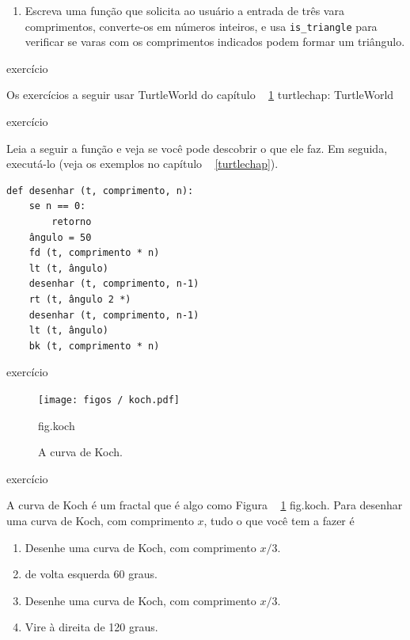 \documentclass[10pt]{book}
\begin{document}
{{\begin{}
\begin{enumerate}
\item Escreva uma função que solicita ao usuário a entrada de três vara
  comprimentos, converte-os em números inteiros, e usa \verb "is_triangle" para
  verificar se varas com os comprimentos indicados podem formar um triângulo.

\end{enumerate}

\end{} exercício

Os exercícios a seguir usar TurtleWorld do capítulo ~ \ref {} turtlechap:
\index{} TurtleWorld

\begin{} exercício

Leia a seguir a função e veja se você pode descobrir
o que ele faz. Em seguida, executá-lo (veja os exemplos no capítulo ~ \ref {turtlechap}).

\begin{verbatim}
def desenhar (t, comprimento, n):
    se n == 0:
        retorno
    ângulo = 50
    fd (t, comprimento * n)
    lt (t, ângulo)
    desenhar (t, comprimento, n-1)
    rt (t, ângulo 2 *)
    desenhar (t, comprimento, n-1)
    lt (t, ângulo)
    bk (t, comprimento * n)
\end{verbatim}

\end{} exercício


\begin{figure}
\centerline
{\texttt{[image: figos / koch.pdf]}}
\caption{A curva de Koch.}
\label{} fig.koch
\end{figure}

\begin{} exercício

A curva de Koch é um fractal que é algo como
Figura ~ \ref {} fig.koch. Para desenhar uma curva de Koch, com comprimento $ x $, tudo o que você
tem a fazer é

\begin{enumerate}

\item Desenhe uma curva de Koch, com comprimento $ x / 3 $.

\item de volta esquerda 60 graus.

\item Desenhe uma curva de Koch, com comprimento $ x / 3 $.

\item Vire à direita de 120 graus.


\end{enumerate}
\end{}}}
\end{document}
